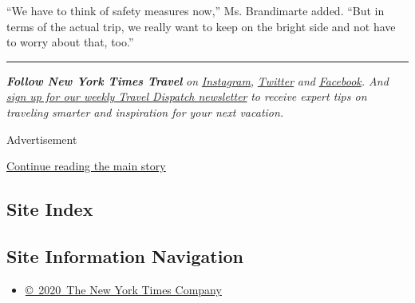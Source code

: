 ``We have to think of safety measures now,'' Ms. Brandimarte added.
``But in terms of the actual trip, we really want to keep on the bright
side and not have to worry about that, too.''

\begin{center}\rule{0.5\linewidth}{\linethickness}\end{center}

\emph{\textbf{Follow New York Times Travel}} \emph{on}
\href{https://www.instagram.com/nytimestravel/}{\emph{Instagram}}\emph{,}
\href{https://twitter.com/nytimestravel}{\emph{Twitter}} \emph{and}
\href{https://www.facebook.com/nytimestravel/}{\emph{Facebook}}\emph{.
And}
\href{https://www.nytimes.com/newsletters/traveldispatch}{\emph{sign up
for our weekly Travel Dispatch newsletter}} \emph{to receive expert tips
on traveling smarter and inspiration for your next vacation.}

Advertisement

\protect\hyperlink{after-bottom}{Continue reading the main story}

\hypertarget{site-index}{%
\subsection{Site Index}\label{site-index}}

\hypertarget{site-information-navigation}{%
\subsection{Site Information
Navigation}\label{site-information-navigation}}

\begin{itemize}
\tightlist
\item
  \href{https://help.nytimes.com/hc/en-us/articles/115014792127-Copyright-notice}{©~2020~The
  New York Times Company}
\end{itemize}

